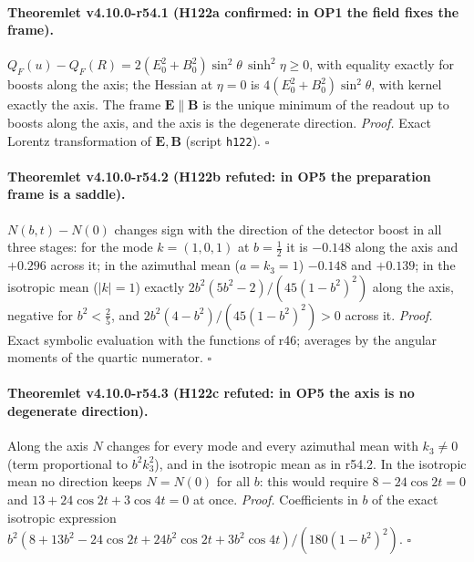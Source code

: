 \paragraph{Theoremlet v4.10.0-r54.1 (H122a confirmed: in OP1 the field fixes the frame).}
\(Q_F(u)-Q_F(R)=2(E_0^2+B_0^2)\sin^2\theta\,\sinh^2\eta\ge0\), with equality exactly for boosts along the axis; the Hessian at \(\eta=0\) is \(4(E_0^2+B_0^2)\sin^2\theta\), with kernel exactly
the axis.  The frame \(\mathbf E\parallel\mathbf B\) is the unique minimum of the readout up to boosts along the axis, and the axis is the degenerate direction.
\emph{Proof.} Exact Lorentz transformation of \(\mathbf E,\mathbf B\) (script \texttt{h122}).  \(\square\)

\paragraph{Theoremlet v4.10.0-r54.2 (H122b refuted: in OP5 the preparation frame is a saddle).}
\(N(b,t)-N(0)\) changes sign with the direction of the detector boost in all three stages: for the mode \(k=(1,0,1)\) at \(b=\tfrac12\) it is \(-0.148\) along the
axis and \(+0.296\) across it; in the azimuthal mean (\(a=k_3=1\)) \(-0.148\) and \(+0.139\); in the isotropic mean (\(|k|=1\)) exactly
\(2b^2(5b^2-2)/(45(1-b^2)^2)\) along the axis, negative for \(b^2<\tfrac25\), and \(2b^2(4-b^2)/(45(1-b^2)^2)>0\) across it.
\emph{Proof.} Exact symbolic evaluation with the functions of r46; averages by the angular moments of the quartic numerator.  \(\square\)

\paragraph{Theoremlet v4.10.0-r54.3 (H122c refuted: in OP5 the axis is no degenerate direction).}
Along the axis \(N\) changes for every mode and every azimuthal mean with \(k_3\ne0\) (term proportional to \(b^2k_3^2\)), and in the isotropic mean as in r54.2.
In the isotropic mean no direction keeps \(N=N(0)\) for all \(b\): this would require \(8-24\cos2t=0\) and \(13+24\cos2t+3\cos4t=0\) at once.
\emph{Proof.} Coefficients in \(b\) of the exact isotropic expression \(b^2(8+13b^2-24\cos2t+24b^2\cos2t+3b^2\cos4t)/(180(1-b^2)^2)\).  \(\square\)

